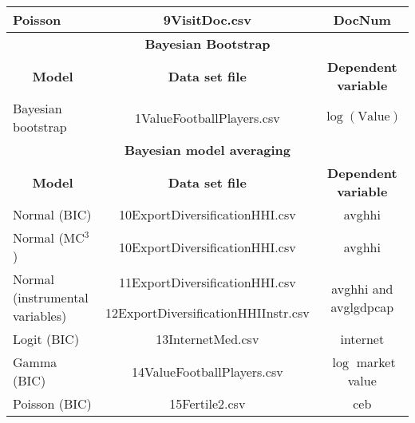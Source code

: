 \begin{table}[!ht]
\begin{center}
{{\begin{tabular}{|l|c|c|}
	\hline
	Poisson & 9VisitDoc.csv  & DocNum \\
	\hline
	\multicolumn{3}{|c|}{\textbf{Bayesian Bootstrap}} \\
	\hline  
	\multicolumn{1}{|c|}{\textbf{Model}} & \multicolumn{1}{c}{\textbf{Data set file}} & \multicolumn{1}{|c|}{\textbf{Dependent variable}} \\ 
	\hline
	Bayesian bootstrap & 1ValueFootballPlayers.csv & $\log(\text{Value})$  \\
	\hline
	\multicolumn{3}{|c|}{\textbf{Bayesian model averaging}} \\
	\hline  
	\multicolumn{1}{|c|}{\textbf{Model}} & \multicolumn{1}{c}{\textbf{Data set file}} & \multicolumn{1}{|c|}{\textbf{Dependent variable}} \\ 
	\hline
	Normal (BIC) & 10ExportDiversificationHHI.csv & avghhi \\
	Normal (MC$^3$) & 10ExportDiversificationHHI.csv & avghhi \\
	\multirow{2}{*}{Normal (instrumental variables)} & 11ExportDiversificationHHI.csv & \multirow{2}{*}{avghhi and avglgdpcap}\\
	& 12ExportDiversificationHHIInstr.csv & \\
	Logit (BIC) & 13InternetMed.csv & internet \\
	Gamma (BIC) & 14ValueFootballPlayers.csv & $\log$ market value\\
	Poisson (BIC) & 15Fertile2.csv & ceb \\
	\hline
	\end{tabular}
}}
\end{center}
\end{table}